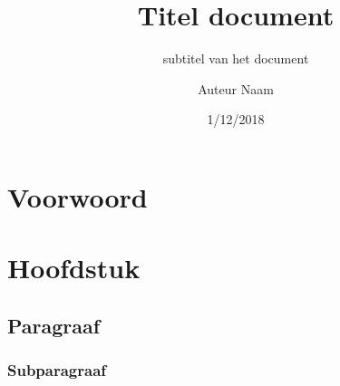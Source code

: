 \documentclass[11pt,a4paper]{scrreprt}
\begin{document}
\title{Titel document}
\subtitle{subtitel van het document}
\author{Auteur Naam}
\date{1/12/2018}
\maketitle

\chapter*{Voorwoord}
\lipsum[1-2]

\tableofcontents

\chapter{Hoofdstuk}
\lipsum[2-3]

\section{Paragraaf}
\lipsum[2-3]

\subsection{Subparagraaf}
\lipsum[1-2]
\end{document}

